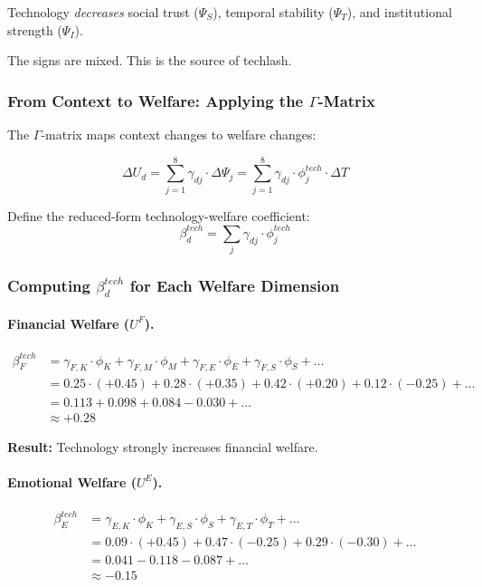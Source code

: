 Technology \emph{decreases} social trust ($\Psi_S$), temporal stability ($\Psi_T$), 
and institutional strength ($\Psi_I$).

The signs are mixed. This is the source of techlash.

\subsubsection{From Context to Welfare: Applying the $\Gamma$-Matrix}

The $\Gamma$-matrix maps context changes to welfare changes:

\begin{equation}
\Delta U_d = \sum_{j=1}^{8} \gamma_{dj} \cdot \Delta \Psi_j = \sum_{j=1}^{8} \gamma_{dj} \cdot \phi_j^{tech} \cdot \Delta T
\label{eq:tech-welfare}
\end{equation}

Define the reduced-form technology-welfare coefficient:
\begin{equation}
\beta_d^{tech} = \sum_j \gamma_{dj} \cdot \phi_j^{tech}
\end{equation}

\subsubsection{Computing $\beta_d^{tech}$ for Each Welfare Dimension}

\paragraph{Financial Welfare ($U^F$).}
\begin{align}
\beta_F^{tech} &= \gamma_{F,K} \cdot \phi_K + \gamma_{F,M} \cdot \phi_M + \gamma_{F,E} \cdot \phi_E + \gamma_{F,S} \cdot \phi_S + \ldots \nonumber \\
&= 0.25 \cdot (+0.45) + 0.28 \cdot (+0.35) + 0.42 \cdot (+0.20) + 0.12 \cdot (-0.25) + \ldots \nonumber \\
&= 0.113 + 0.098 + 0.084 - 0.030 + \ldots \nonumber \\
&\approx \mathbf{+0.28}
\end{align}

\textbf{Result:} Technology strongly increases financial welfare.

\paragraph{Emotional Welfare ($U^E$).}
\begin{align}
\beta_E^{tech} &= \gamma_{E,K} \cdot \phi_K + \gamma_{E,S} \cdot \phi_S + \gamma_{E,T} \cdot \phi_T + \ldots \nonumber \\
&= 0.09 \cdot (+0.45) + 0.47 \cdot (-0.25) + 0.29 \cdot (-0.30) + \ldots \nonumber \\
&= 0.041 - 0.118 - 0.087 + \ldots \nonumber \\
&\approx \mathbf{-0.15}
\end{align}

